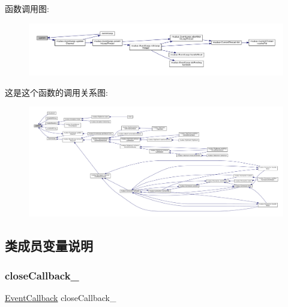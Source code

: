 函数调用图\+:
\nopagebreak
\begin{figure}[H]
\begin{center}
\leavevmode
\includegraphics[width=350pt]{classmuduo_1_1Channel_ac5c54df7ed3b930268c8d7752c101725_cgraph}
\end{center}
\end{figure}
这是这个函数的调用关系图\+:
\nopagebreak
\begin{figure}[H]
\begin{center}
\leavevmode
\includegraphics[width=350pt]{classmuduo_1_1Channel_ac5c54df7ed3b930268c8d7752c101725_icgraph}
\end{center}
\end{figure}


\subsection{类成员变量说明}
\mbox{\label{classmuduo_1_1Channel_a97e25dcb601312c3c9b94e4cfa56865c}} 
\subsubsection{\texorpdfstring{close\+Callback\+\_\+}{closeCallback\_}}
{\footnotesize\ttfamily \hyperlink{classmuduo_1_1Channel_aba4530f63bcce7091a51e66d01f4d2cb}{Event\+Callback} close\+Callback\+\_\+\hspace{0.3cm}{\ttfamily [private]}}



